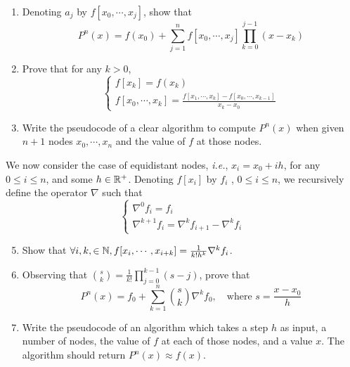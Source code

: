 \begin{enumerate}
\begin{enumerate}[(a)]
\begin{proof}
		Assume this holds for \(j=n\), which means for all $m$ such that \(0\leq m\leq n, P^n(x_m)=f(x_m)\).
		We need to prove
		\[ \forall m \textrm{ such that } 0\leq m\leq n+1, P^{n}(x_m)+a_{n+1}\prod_{k=0}^{n}(x_m-x_k) = f(x_m)  \]
		This is obvious for \(0\leq m\leq n\), since the product always contains a zero factor and is zero.
		So we just need the condition for \(m=n+1\).
		\[ P^{n}(x_{n+1})+a_{n+1}\prod_{k=0}^{n}(x_{n+1}-x_k) = f(x_{n+1}) \]
		Then we obtain the coefficient
		\[ a_{n+1}=\frac{f(x_{n+1})-P^{n}(x_{n+1})}{\prod_{k=0}^{n}(x_{n+1}-x_k)} \]
		This only depends on \(x_0,\cdots,x_{n+1}\).
		So we have
		\[ P^{n+1} \]
		\end{proof}
	\end{enumerate}
	\item Denoting $a_j$ by \(f[x_0,\cdots, x_j]\), show that
	\[ P^n(x)=f(x_0)+\sum_{j=1}^{n} f[x_0,\cdots, x_j] \prod_{k=0}^{j-1}(x-x_k) \]
	\item Prove that for any \(k > 0\),
	\[ \begin{cases} f[x_k] =f(x_k) \\ f[x_0,\cdots, x_k]=\frac{f[x_1,\cdots, x_k]-f[x_0,\cdots, x_{k-1}]}{x_k-x_0} \end{cases} \]
	\item Write the pseudocode of a clear algorithm to compute \(P^n(x)\) when given $n+1$ nodes \(x_0,\cdots,x_n\) and the value of $f$ at those nodes.
\end{enumerate}

We now consider the case of equidistant nodes, \textit{i.e.}, \(x_i = x_0 + ih\), for any \(0\leq i\leq n\), and some \(h\in\mathbb{R}^+\).
Denoting \(f[x_i]\) by $f_i$ , \(0\leq i\leq n\), we recursively define the operator $\nabla$ such that
\[ \begin{cases} \nabla^0 f_i=f_i \\ \nabla^{k+1}f_i=\nabla^{k}f_{i+1}-\nabla^{k}f_{i} \end{cases} \]

\begin{enumerate}
	\setcounter{enumi}{4}
	\item Show that \(\forall i,k,\in\mathbb{N}, f[x_i,\cdots,x_{i+k}]=\frac{1}{k!h^k}\nabla^{k}f_i\).
	\item Observing that \(\binom{s}{k}=\frac{1}{k!}\prod_{j=0}^{k-1}(s-j)\), prove that 
	\[ P^n(x)=f_0 + \sum_{k=1}^{n}\binom{s}{k}\nabla^{k} f_0, \quad \textrm{where } s=\frac{x-x_0}{h} \]
	\item Write the pseudocode of an algorithm which takes a step $h$ as input, a number of nodes, the value of $f$ at each of those nodes, and a value $x$.
	The algorithm should return \(P^{n}(x)\approx f(x)\).
\end{enumerate}